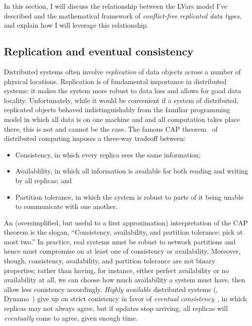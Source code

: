 \documentclass{article}
\begin{document}
In this section, I will discuss the relationship between the LVars
model I've described and the mathematical framework of
\emph{conflict-free replicated data types}, and explain how I will
leverage this relationship.

\subsection{Replication and eventual consistency}

Distributed systems often involve \emph{replication} of data objects
across a number of physical locations.  Replication is of fundamental
importance in distributed systems: it makes the system more robust to
data loss and allows for good data locality.  Unfortunately, while it
would be convenient if a system of distributed, replicated objects
behaved indistinguishably from the familiar programming model in which
all data is on one machine and and all computation takes place there,
this is not and cannot be the case.  The famous CAP
theorem~\cite{gilbert-lynch-cap} of distributed computing imposes a
three-way tradeoff between:
\begin{itemize}
\item Consistency, in which every replica sees the same information;
\item Availablility, in which all information is available for both
  reading and writing by all replicas; and
\item Partition tolerance, in which the system is robust to parts of
  it being unable to communicate with one another.
\end{itemize}
An (oversimplified, but useful to a first approximation)
interpretation of the CAP theorem is the slogan, ``Consistency,
availability, and partition tolerance: pick at most two.''  In
practice, real systems must be robust to network partitions and hence
must compromise on at least one of consistency or availability.
Moreover, though, consistency, availability, and partition tolerance
are not binary properties; rather than having, for instance, either
perfect availability or no availability at all, we can choose how much
availability a system must have, then allow less conistency
accordingly.  \emph{Highly available} distributed systems (\eg,
Dynamo~\cite{dynamo}) give up on strict conistency in favor of
\emph{eventual consistency}~\cite{vogels-ec}, in which replicas may
not always agree, but if updates stop arriving, all replicas will
\emph{eventually} come to agree, given enough time.
\end{document}
